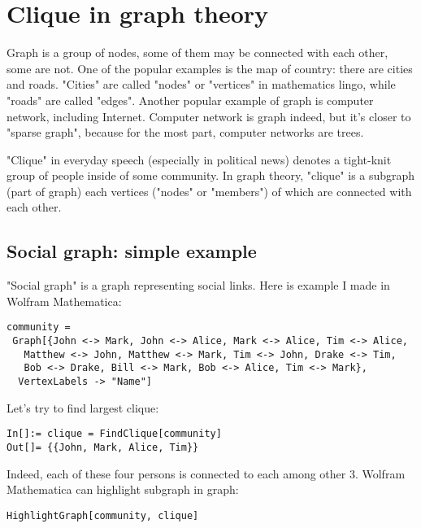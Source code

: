 \section{Clique in graph theory}

\renewcommand{\CURPATH}{MaxSMT/clique}

Graph is a group of nodes, some of them may be connected with each other, some are not.
One of the popular examples is the map of country: there are cities and roads.
"Cities" are called "nodes" or "vertices" in mathematics lingo, while "roads" are called "edges".
Another popular example of graph is computer network, including Internet.
Computer network is graph indeed, but it's closer to "sparse graph", because for the most part, computer networks are trees.

"Clique" in everyday speech (especially in political news) denotes a tight-knit group of people inside of some community.
In graph theory, "clique" is a subgraph (part of graph) each vertices ("nodes" or "members") of which are connected with each other.

\subsection{Social graph: simple example}

"Social graph" is a graph representing social links.
Here is example I made in Wolfram Mathematica:

\begin{lstlisting}
community = 
 Graph[{John <-> Mark, John <-> Alice, Mark <-> Alice, Tim <-> Alice, 
   Matthew <-> John, Matthew <-> Mark, Tim <-> John, Drake <-> Tim, 
   Bob <-> Drake, Bill <-> Mark, Bob <-> Alice, Tim <-> Mark}, 
  VertexLabels -> "Name"]
\end{lstlisting}

\begin{figure}[H]
\centering
{}
\end{figure}

Let's try to find largest clique:

\begin{lstlisting}
In[]:= clique = FindClique[community]
Out[]= {{John, Mark, Alice, Tim}}
\end{lstlisting}

Indeed, each of these four persons is connected to each among other 3.
Wolfram Mathematica can highlight subgraph in graph:

\begin{lstlisting}
HighlightGraph[community, clique]
\end{lstlisting}


